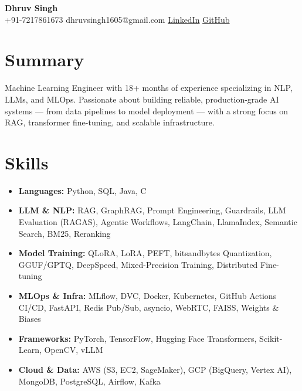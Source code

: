 \documentclass[letterpaper,9pt]{extarticle}
\begin{document}
\begin{center}
  {\LARGE\bfseries Dhruv Singh}\\[2pt]
  +91-7217861673 \textbar{} dhruvsingh1605@gmail.com \textbar{}
  \href{https://www.linkedin.com/in/dhruv-singh-78a503203}{LinkedIn} \textbar{}
  \href{https://github.com/Dhruvsingh1605}{GitHub}
\end{center}

\section{Summary}
Machine Learning Engineer with 18+ months of experience specializing in NLP, LLMs, and MLOps. Passionate about building reliable, production-grade AI systems --- from data pipelines to model deployment --- with a strong focus on RAG, transformer fine-tuning, and scalable infrastructure.

\section{Skills}
\begin{itemize}[label={},leftmargin=10pt,itemsep=0pt,topsep=0pt]
  \item \textbf{Languages:} Python, SQL, Java, C
  \item \textbf{LLM \& NLP:} RAG, GraphRAG, Prompt Engineering, Guardrails, LLM Evaluation (RAGAS), Agentic Workflows, LangChain, LlamaIndex, Semantic Search, BM25, Reranking
  \item \textbf{Model Training:} QLoRA, LoRA, PEFT, bitsandbytes Quantization, GGUF/GPTQ, DeepSpeed, Mixed-Precision Training, Distributed Fine-tuning
  \item \textbf{MLOps \& Infra:} MLflow, DVC, Docker, Kubernetes, GitHub Actions CI/CD, FastAPI, Redis Pub/Sub, asyncio, WebRTC, FAISS, Weights \& Biases
  \item \textbf{Frameworks:} PyTorch, TensorFlow, Hugging Face Transformers, Scikit-Learn, OpenCV, vLLM
  \item \textbf{Cloud \& Data:} AWS (S3, EC2, SageMaker), GCP (BigQuery, Vertex AI), MongoDB, PostgreSQL, Airflow, Kafka
\end{itemize}
\end{document}
